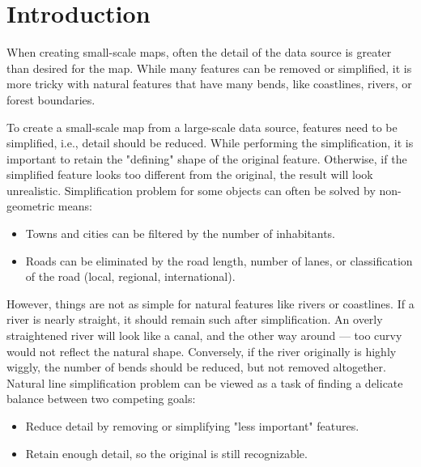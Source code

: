 \documentclass[a4paper]{article}
\begin{document}
\clearpage

\tableofcontents

\listoftables
\listoflistings

\newpage

\section{Introduction}
\label{sec:introduction}

When creating small-scale maps, often the detail of the data source is greater
than desired for the map. While many features can be removed or simplified, it
is more tricky with natural features that have many bends, like coastlines,
rivers, or forest boundaries.

To create a small-scale map from a large-scale data source, features need to be
simplified, i.e., detail should be reduced. While performing the
simplification, it is important to retain the "defining" shape of the original
feature. Otherwise, if the simplified feature looks too different from the
original, the result will look unrealistic. Simplification problem for some
objects can often be solved by non-geometric means:

\begin{itemize}
    \item Towns and cities can be filtered by the number of inhabitants.
    \item Roads can be eliminated by the road length, number of lanes, or
        classification of the road (local, regional, international).
\end{itemize}

However, things are not as simple for natural features like rivers or
coastlines. If a river is nearly straight, it should remain such after
simplification. An overly straightened river will look like a canal, and the
other way around --- too curvy would not reflect the natural shape. Conversely,
if the river originally is highly wiggly, the number of bends should be
reduced, but not removed altogether. Natural line simplification problem can be
viewed as a task of finding a delicate balance between two competing goals:

\begin{itemize}
    \item Reduce detail by removing or simplifying "less important" features.
    \item Retain enough detail, so the original is still recognizable.
\end{itemize}
\end{document}
